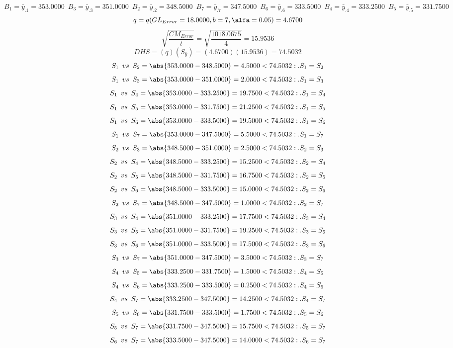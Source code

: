 $$B_{1}=\bar{y}_{.1}=353.0000 \enspace B_{3}=\bar{y}_{.3}=351.0000 \enspace B_{2}=\bar{y}_{.2}=348.5000 \enspace B_{7}=\bar{y}_{.7}=347.5000 \enspace B_{6}=\bar{y}_{.6}=333.5000 \enspace B_{4}=\bar{y}_{.4}=333.2500 \enspace B_{5}=\bar{y}_{.5}=331.7500$$
$$q=q(GL_{Error}=18.0000, b=7, \alfa=0.05)=4.6700$$
$$\sqrt{\frac{CM_{Error}}{t}}=\sqrt{\frac{1018.0675}{4}}=15.9536$$
$$DHS=(q)(S_{\bar{y}})=(4.6700)(15.9536)=74.5032$$
$$S_{1} \enspace vs \enspace S_{2} = \abs{353.0000-348.5000}=4.5000<74.5032:.S_{1}=S_{2}$$
$$S_{1} \enspace vs \enspace S_{3} = \abs{353.0000-351.0000}=2.0000<74.5032:.S_{1}=S_{3}$$
$$S_{1} \enspace vs \enspace S_{4} = \abs{353.0000-333.2500}=19.7500<74.5032:.S_{1}=S_{4}$$
$$S_{1} \enspace vs \enspace S_{5} = \abs{353.0000-331.7500}=21.2500<74.5032:.S_{1}=S_{5}$$
$$S_{1} \enspace vs \enspace S_{6} = \abs{353.0000-333.5000}=19.5000<74.5032:.S_{1}=S_{6}$$
$$S_{1} \enspace vs \enspace S_{7} = \abs{353.0000-347.5000}=5.5000<74.5032:.S_{1}=S_{7}$$
$$S_{2} \enspace vs \enspace S_{3} = \abs{348.5000-351.0000}=2.5000<74.5032:.S_{2}=S_{3}$$
$$S_{2} \enspace vs \enspace S_{4} = \abs{348.5000-333.2500}=15.2500<74.5032:.S_{2}=S_{4}$$
$$S_{2} \enspace vs \enspace S_{5} = \abs{348.5000-331.7500}=16.7500<74.5032:.S_{2}=S_{5}$$
$$S_{2} \enspace vs \enspace S_{6} = \abs{348.5000-333.5000}=15.0000<74.5032:.S_{2}=S_{6}$$
$$S_{2} \enspace vs \enspace S_{7} = \abs{348.5000-347.5000}=1.0000<74.5032:.S_{2}=S_{7}$$
$$S_{3} \enspace vs \enspace S_{4} = \abs{351.0000-333.2500}=17.7500<74.5032:.S_{3}=S_{4}$$
$$S_{3} \enspace vs \enspace S_{5} = \abs{351.0000-331.7500}=19.2500<74.5032:.S_{3}=S_{5}$$
$$S_{3} \enspace vs \enspace S_{6} = \abs{351.0000-333.5000}=17.5000<74.5032:.S_{3}=S_{6}$$
$$S_{3} \enspace vs \enspace S_{7} = \abs{351.0000-347.5000}=3.5000<74.5032:.S_{3}=S_{7}$$
$$S_{4} \enspace vs \enspace S_{5} = \abs{333.2500-331.7500}=1.5000<74.5032:.S_{4}=S_{5}$$
$$S_{4} \enspace vs \enspace S_{6} = \abs{333.2500-333.5000}=0.2500<74.5032:.S_{4}=S_{6}$$
$$S_{4} \enspace vs \enspace S_{7} = \abs{333.2500-347.5000}=14.2500<74.5032:.S_{4}=S_{7}$$
$$S_{5} \enspace vs \enspace S_{6} = \abs{331.7500-333.5000}=1.7500<74.5032:.S_{5}=S_{6}$$
$$S_{5} \enspace vs \enspace S_{7} = \abs{331.7500-347.5000}=15.7500<74.5032:.S_{5}=S_{7}$$
$$S_{6} \enspace vs \enspace S_{7} = \abs{333.5000-347.5000}=14.0000<74.5032:.S_{6}=S_{7}$$



